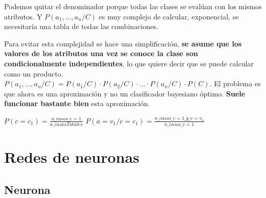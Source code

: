 \documentclass[12pt, twoside, openright]{report} %
\begin{document}
Podemos quitar el denominador porque todas las clases se evalúan con los mismos atributos. Y \(P(a_1, ...,a_n/C)\) es muy complejo de calcular, exponencial, se necesitaría una tabla de todas las combinaciones.

Para evitar esta complejidad se hace una simplificación, \textbf{se asume que los valores de los atributos una vez se conoce la clase son condicionalmente independientes}, lo que quiere decir que se puede calcular como un producto. \(P(a_1, ...,a_n/C) = P(a_1/C) \cdot P(a_2/C) \cdot ... \cdot P(a_n/C) \cdot P(C)\). El problema es que ahora es una aproximación y no un clasificador bayesiano óptimo. \textbf{Suele funcionar bastante bien} esta aproximación.

\(P(c=c_1)= \frac {n\_casos\_c=1}{n\_casosTotales}\) \(P(a=v_1/c=c_1)= \frac {n\_casos\_c=1\_y\_v=v_1}{n\_casos\_c=1}\)

\section{Redes de neuronas}

\subsection{Neurona}
\end{document}
